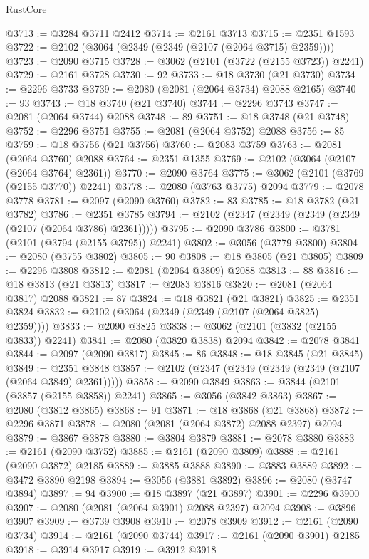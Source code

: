 \begin{lexlean}{RustCore}
\begin{coremodule}
@3713 := @3284 @3711 @2412
@3714 := @2161 @3713
@3715 := @2351 @1593
@3722 := @2102 (@3064 (@2349 (@2349 (@2107 (@2064 @3715) @2359))))
@3723 := @2090 @3715
@3728 := @3062 (@2101 (@3722 (@2155 @3723)) @2241)
@3729 := @2161 @3728
@3730 := 92
@3733 := @18 @3730 (@21 @3730)
@3734 := @2296 @3733
@3739 := @2080 (@2081 (@2064 @3734) @2088 @2165)
@3740 := 93
@3743 := @18 @3740 (@21 @3740)
@3744 := @2296 @3743
@3747 := @2081 (@2064 @3744) @2088
@3748 := 89
@3751 := @18 @3748 (@21 @3748)
@3752 := @2296 @3751
@3755 := @2081 (@2064 @3752) @2088
@3756 := 85
@3759 := @18 @3756 (@21 @3756)
@3760 := @2083 @3759
@3763 := @2081 (@2064 @3760) @2088
@3764 := @2351 @1355
@3769 := @2102 (@3064 (@2107 (@2064 @3764) @2361))
@3770 := @2090 @3764
@3775 := @3062 (@2101 (@3769 (@2155 @3770)) @2241)
@3778 := @2080 (@3763 @3775) @2094
@3779 := @2078 @3778
@3781 := @2097 (@2090 @3760)
@3782 := 83
@3785 := @18 @3782 (@21 @3782)
@3786 := @2351 @3785
@3794 := @2102 (@2347 (@2349 (@2349 (@2349 (@2107 (@2064 @3786) @2361)))))
@3795 := @2090 @3786
@3800 := @3781 (@2101 (@3794 (@2155 @3795)) @2241)
@3802 := @3056 (@3779 @3800)
@3804 := @2080 (@3755 @3802)
@3805 := 90
@3808 := @18 @3805 (@21 @3805)
@3809 := @2296 @3808
@3812 := @2081 (@2064 @3809) @2088
@3813 := 88
@3816 := @18 @3813 (@21 @3813)
@3817 := @2083 @3816
@3820 := @2081 (@2064 @3817) @2088
@3821 := 87
@3824 := @18 @3821 (@21 @3821)
@3825 := @2351 @3824
@3832 := @2102 (@3064 (@2349 (@2349 (@2107 (@2064 @3825) @2359))))
@3833 := @2090 @3825
@3838 := @3062 (@2101 (@3832 (@2155 @3833)) @2241)
@3841 := @2080 (@3820 @3838) @2094
@3842 := @2078 @3841
@3844 := @2097 (@2090 @3817)
@3845 := 86
@3848 := @18 @3845 (@21 @3845)
@3849 := @2351 @3848
@3857 := @2102 (@2347 (@2349 (@2349 (@2349 (@2107 (@2064 @3849) @2361)))))
@3858 := @2090 @3849
@3863 := @3844 (@2101 (@3857 (@2155 @3858)) @2241)
@3865 := @3056 (@3842 @3863)
@3867 := @2080 (@3812 @3865)
@3868 := 91
@3871 := @18 @3868 (@21 @3868)
@3872 := @2296 @3871
@3878 := @2080 (@2081 (@2064 @3872) @2088 @2397) @2094
@3879 := @3867 @3878
@3880 := @3804 @3879
@3881 := @2078 @3880
@3883 := @2161 (@2090 @3752)
@3885 := @2161 (@2090 @3809)
@3888 := @2161 (@2090 @3872) @2185
@3889 := @3885 @3888
@3890 := @3883 @3889
@3892 := @3472 @3890 @2198
@3894 := @3056 (@3881 @3892)
@3896 := @2080 (@3747 @3894)
@3897 := 94
@3900 := @18 @3897 (@21 @3897)
@3901 := @2296 @3900
@3907 := @2080 (@2081 (@2064 @3901) @2088 @2397) @2094
@3908 := @3896 @3907
@3909 := @3739 @3908
@3910 := @2078 @3909
@3912 := @2161 (@2090 @3734)
@3914 := @2161 (@2090 @3744)
@3917 := @2161 (@2090 @3901) @2185
@3918 := @3914 @3917
@3919 := @3912 @3918

\end{coremodule}
\end{lexlean}
